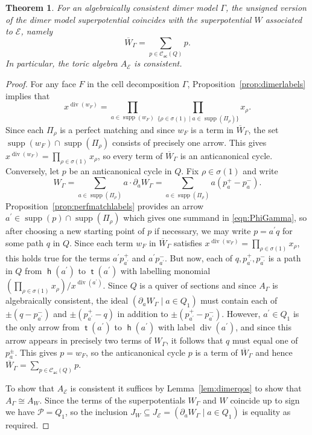 \documentclass[11pt,a4paper]{amsart}
\numberwithin{equation}{section}
\newtheorem{theorem}{Theorem}[section]
\theoremstyle{definition}
\theoremstyle{remark}
\renewcommand{\div}{\operatorname{div}}
\newcommand{\head}{\operatorname{\mathsf{h}}}
\newcommand{\supp}{\operatorname{supp}}
\newcommand{\tail}{\operatorname{\mathsf{t}}}
\newcommand{\ACcyc}{\ensuremath{\mathscr{C}_{\mathsf{ac}}(Q)}}
\begin{document}
\begin{theorem}
\label{thm:unsignedsuperpotentials}
For an algebraically consistent dimer model $\Gamma$, the unsigned version of the dimer model superpotential coincides with the superpotential $W$ associated to $\mathscr{E}$, namely
\[
\overline{W}_\Gamma = \sum_{p\in \ACcyc} p.
\]
In particular, the toric algebra $A_\mathscr{E}$ is consistent.
 \end{theorem}
\begin{proof}
For any face $F$ in the cell decomposition $\Gamma$,  Proposition~\ref{prop:dimerlabels} implies that
\begin{equation}
\label{eqn:divp}
x^{\div(w_F)} = \prod_{a\in \supp(w_F)}  \prod_{\{\rho\in \sigma(1) \mid a\in \supp(\Pi_\rho)\}} x_\rho.
\end{equation}
 Since each $\Pi_\rho$ is a perfect matching and since $w_F$ is a term in $\overline{W}_\Gamma$, the set $ \supp(w_F)\cap \supp(\Pi_\rho)$ consists of precisely one arrow. This gives $x^{\div(w_F)} =  \prod_{\rho\in \sigma(1)} x_\rho$, so every term of $\overline{W}_\Gamma$ is an anticanonical cycle. Conversely, let $p$ be an anticanonical cycle in $Q$. Fix $\rho\in \sigma(1)$ and write 
\begin{equation}
\label{eqn:PhiGamma}
W_\Gamma = \sum_{a\in \supp(\Pi_\rho)} a \cdot\partial_aW_\Gamma  = \sum_{a\in \supp(\Pi_\rho)} a (p_a^+-p_a^-).
\end{equation}
Proposition~\ref{prop:perfmatchlabels} provides an arrow $a^\prime\in \supp(p)\cap \supp(\Pi_\rho)$ which gives one summand in \eqref{eqn:PhiGamma}, so after choosing a new starting point of $p$ if necessary, we may write $p=a^\prime q$ for some path $q$ in $Q$. Since each term $w_F$ in $\overline{W}_\Gamma$ satisfies $x^{\div(w_F)} =  \prod_{\rho\in \sigma(1)} x_\rho$,  this holds true for the terms $a^\prime p_{a^\prime}^+$ and $a^\prime p_{a^\prime}^-$. But now, each of $q, p_{a^\prime}^+, p_{a^\prime}^-$ is a path in $Q$ from $\head(a^\prime)$ to $\tail(a^\prime)$ with labelling monomial $(\prod_{\rho\in \sigma(1)} x_\rho)/x^{\div(a^\prime)}$. Since $Q$ is a quiver of sections and since $A_\Gamma$ is algebraically consistent, the ideal $(\partial_a W_\Gamma \mid a\in Q_1)$ must contain each of $\pm(q-p_{a^\prime}^-)$ and $\pm(p_{a^\prime}^+-q)$ in addition to $\pm(p_{a^\prime}^+-p_{a^\prime}^-)$. However, $a^\prime\in Q_1$ is the only arrow from $\tail(a^\prime)$ to $\head(a^\prime)$ with label $\div(a^\prime)$, and since this arrow appears in precisely two terms of $W_\Gamma$, it follows that $q$ must equal one of $p_a^{\pm}$. This gives $p= w_F$, so the anticanonical cycle $p$ is a term of $\overline{W}_{\Gamma}$ and hence $\overline{W}_\Gamma = \sum_{p\in \ACcyc} p$.

To show that $A_\mathscr{E}$ is consistent it suffices by Lemma~\ref{lem:dimerqos} to show that $A_\Gamma\cong A_W$. Since the terms of the superpotentials $W_\Gamma$ and $W$ coincide up to sign we have $\mathscr{P}=Q_1$, so the inclusion $J_W\subseteq J_\mathscr{E} = (\partial_a W_\Gamma \mid a\in Q_1)$ is equality as required.
\end{proof}
\end{document}
